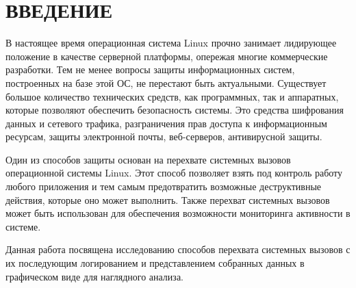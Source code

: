 \section*{ВВЕДЕНИЕ}

В настоящее время операционная система Linux прочно занимает лидирующее положение в качестве серверной платформы, опережая многие коммерческие разработки. Тем не менее вопросы защиты информационных систем, построенных на базе этой ОС, не перестают быть актуальными. Существует большое количество технических средств, как программных, так и аппаратных, которые позволяют обеспечить безопасность системы. Это средства шифрования данных и сетевого трафика, разграничения прав доступа к информационным ресурсам, защиты электронной почты, веб-серверов, антивирусной защиты.

Один из способов защиты основан на перехвате системных вызовов операционной системы Linux. Этот способ позволяет взять под контроль работу любого приложения и тем самым предотвратить возможные деструктивные действия, которые оно может выполнить. Также перехват системных вызовов может быть использован для обеспечения возможности мониторинга активности в системе.

Данная работа посвящена исследованию способов перехвата системных вызовов с их последующим логированием и представлением собранных данных в графическом виде для наглядного анализа.

\pagebreak